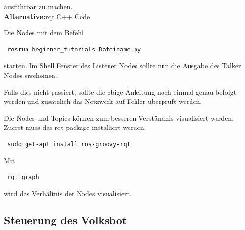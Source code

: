 \documentclass[12pt]{article}
\begin{document}
ausführbar zu machen. \\
{\bf Alternative:}rqt C++ Code

Die Nodes mit dem Befehl 

 \begin{lstlisting}
 rosrun beginner_tutorials Dateiname.py
 \end{lstlisting}
 
starten.
Im Shell Fenster des Listener Nodes sollte nun die Ausgabe des Talker Nodes erscheinen.

Falls dies nicht passiert, sollte die obige Anleitung noch einmal genau befolgt werden und zusätzlich das Netzwerk auf Fehler überprüft werden.

Die Nodes und Topics können zum besseren Verständnis visualisiert werden.
Zuerst muss das rqt package installiert werden.

 \begin{lstlisting}
 sudo get-apt install ros-groovy-rqt
 \end{lstlisting}

Mit 

 \begin{lstlisting}
 rqt_graph 
 \end{lstlisting}

wird das Verhältnis der Nodes visualisiert.





	

\subsection{Steuerung des Volksbot}
\end{document}

